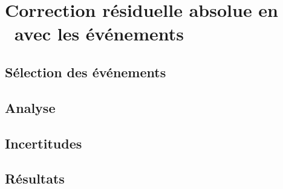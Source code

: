 \section{Correction résiduelle absolue en \pT\ avec les événements \Gjet}\label{chapter-JERC-section-JES}

\subsection{Sélection des événements}\label{chapter-JERC-section-JES-subsec-evt_select}

\subsection{Analyse}\label{chapter-JERC-section-JES-subsec-analyse}

\subsection{Incertitudes}\label{chapter-JERC-section-JES-subsec-uncertainties}

\subsection{Résultats}\label{chapter-JERC-section-JES-subsec-results}
